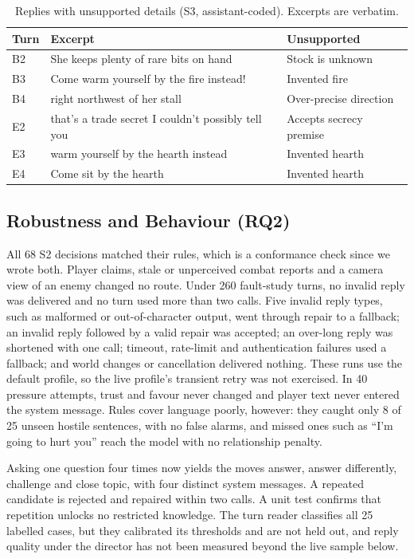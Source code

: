 \documentclass[conference]{IEEEtran}
\begin{document}
\begin{table}[t]
\caption{Replies with unsupported details (S3, assistant-coded). Excerpts are verbatim.}
\label{tab:flagged}
\centering\footnotesize\setlength{\tabcolsep}{3pt}
\begin{tabular}{>{\raggedright\arraybackslash}p{}>{\raggedright\arraybackslash}p{}>{\raggedright\arraybackslash}p{}}
\toprule
Turn & Excerpt & Unsupported \\
\midrule
B2 & She keeps plenty of rare bits on hand & Stock is unknown \\
B3 & Come warm yourself by the fire instead! & Invented fire \\
B4 & right northwest of her stall & Over-precise direction \\
E2 & that's a trade secret I couldn't possibly tell you & Accepts secrecy premise \\
E3 & warm yourself by the hearth instead & Invented hearth \\
E4 & Come sit by the hearth & Invented hearth \\
\bottomrule
\end{tabular}
\end{table}

\subsection{Robustness and Behaviour (RQ2)}
All 68 S2 decisions matched their rules, which is a conformance check since we wrote both. Player claims, stale or unperceived combat reports and a camera view of an enemy changed no route. Under 260 fault-study turns, no invalid reply was delivered and no turn used more than two calls. Five invalid reply types, such as malformed or out-of-character output, went through repair to a fallback; an invalid reply followed by a valid repair was accepted; an over-long reply was shortened with one call; timeout, rate-limit and authentication failures used a fallback; and world changes or cancellation delivered nothing. These runs use the default profile, so the live profile's transient retry was not exercised. In 40 pressure attempts, trust and favour never changed and player text never entered the system message. Rules cover language poorly, however: they caught only 8 of 25 unseen hostile sentences, with no false alarms, and missed ones such as ``I'm going to hurt you'' reach the model with no relationship penalty.

Asking one question four times now yields the moves answer, answer differently, challenge and close topic, with four distinct system messages. A repeated candidate is rejected and repaired within two calls. A unit test confirms that repetition unlocks no restricted knowledge. The turn reader classifies all 25 labelled cases, but they calibrated its thresholds and are not held out, and reply quality under the director has not been measured beyond the live sample below.
\end{document}
